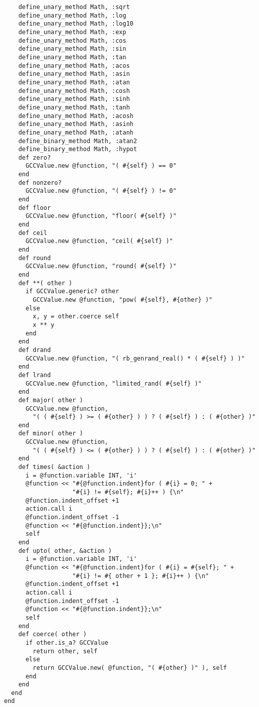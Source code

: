 \begin{lstlisting}
    define_unary_method Math, :sqrt
    define_unary_method Math, :log
    define_unary_method Math, :log10
    define_unary_method Math, :exp
    define_unary_method Math, :cos
    define_unary_method Math, :sin
    define_unary_method Math, :tan
    define_unary_method Math, :acos
    define_unary_method Math, :asin
    define_unary_method Math, :atan
    define_unary_method Math, :cosh
    define_unary_method Math, :sinh
    define_unary_method Math, :tanh
    define_unary_method Math, :acosh
    define_unary_method Math, :asinh
    define_unary_method Math, :atanh
    define_binary_method Math, :atan2
    define_binary_method Math, :hypot
    def zero?
      GCCValue.new @function, "( #{self} ) == 0"
    end
    def nonzero?
      GCCValue.new @function, "( #{self} ) != 0"
    end
    def floor
      GCCValue.new @function, "floor( #{self} )"
    end
    def ceil
      GCCValue.new @function, "ceil( #{self} )"
    end
    def round
      GCCValue.new @function, "round( #{self} )"
    end
    def **( other )
      if GCCValue.generic? other
        GCCValue.new @function, "pow( #{self}, #{other} )"
      else
        x, y = other.coerce self
        x ** y
      end
    end
    def drand
      GCCValue.new @function, "( rb_genrand_real() * ( #{self} ) )"
    end
    def lrand
      GCCValue.new @function, "limited_rand( #{self} )"
    end
    def major( other )
      GCCValue.new @function,
        "( ( #{self} ) >= ( #{other} ) ) ? ( #{self} ) : ( #{other} )"
    end
    def minor( other )
      GCCValue.new @function,
        "( ( #{self} ) <= ( #{other} ) ) ? ( #{self} ) : ( #{other} )"
    end
    def times( &action )
      i = @function.variable INT, 'i'
      @function << "#{@function.indent}for ( #{i} = 0; " +
                   "#{i} != #{self}; #{i}++ ) {\n"
      @function.indent_offset +1
      action.call i
      @function.indent_offset -1
      @function << "#{@function.indent}};\n"
      self
    end
    def upto( other, &action )
      i = @function.variable INT, 'i'
      @function << "#{@function.indent}for ( #{i} = #{self}; " +
                   "#{i} != #{ other + 1 }; #{i}++ ) {\n"
      @function.indent_offset +1
      action.call i
      @function.indent_offset -1
      @function << "#{@function.indent}};\n"
      self
    end
    def coerce( other )
      if other.is_a? GCCValue
        return other, self
      else
        return GCCValue.new( @function, "( #{other} )" ), self
      end
    end
  end
end
\end{lstlisting}
